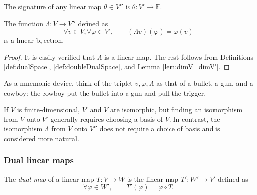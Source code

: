 \begin{rem}
  The signature of any linear map $\theta\in V''$ is
   \mbox{$\theta: V'\rightarrow \mathbb{F}$}.
\end{rem}

\begin{lem}
  \label{lem:dualDualAuxFunc}
  The function $\Lambda: V\rightarrow V''$
   defined as
   \begin{equation}
     \label{eq:dualDualAuxFunc}
     \forall v\in V, \forall \varphi\in V',\qquad
     (\Lambda v) (\varphi) = \varphi(v)
   \end{equation}
   is a linear bijection.
\end{lem}
\begin{proof}
  It is easily verified that
   $\Lambda$ is a linear map.
  The rest follows from
   Definitions \ref{def:dualSpace}, \ref{def:doubleDualSpace},
   and Lemma \ref{lem:dimV=dimV'}.
\end{proof}

\begin{rem}
  As a mnemonic device,
   think of the triplet $v,\varphi, \Lambda$
   as that of a bullet, a gun, and a cowboy:
   the cowboy put the bullet into a gun and pull the trigger.
\end{rem}

\begin{rem}
 If $V$ is finite-dimensional,
  $V'$ and $V$ are isomorphic,
  but finding an isomorphism from $V$ onto $V'$
  generally requires choosing a basis of $V$.
 In contrast, the isomorphism $\Lambda$ from $V$ onto $V''$
  does not require a choice of basis and
  is considered more natural.  
\end{rem}


\subsubsection{Dual linear maps}

\begin{defn}
  \label{def:dualMap}
  The \emph{dual map} of a linear map 
   \mbox{$T: V\rightarrow W$}
   is the linear map $T': W'\rightarrow V'$
   defined as
   \begin{equation}
     \label{eq:dualMap}
     \forall\varphi\in W',\qquad
     T'(\varphi) = \varphi\circ T.
   \end{equation}
\end{defn}

